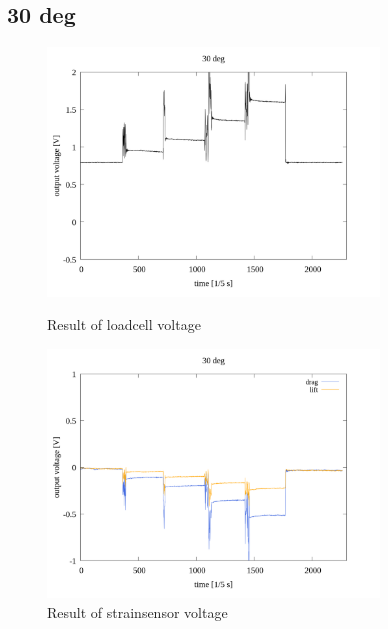 \documentclass[twocolumn,a4j]{jsarticle}
\begin{document}
\subsection{30 deg}
\begin{figure}[htbp]
    \footnotesize
    \begin{center}
        \includegraphics[width=88mm]{../images/voltage-time/30_loadcell.png}
        \caption{Result of loadcell voltage}
        \includegraphics[width=88mm]{../images/voltage-time/30_strainsensor.png}
        \caption{Result of strainsensor voltage}
    \end{center}
\end{figure}

\newpage
\end{document}
